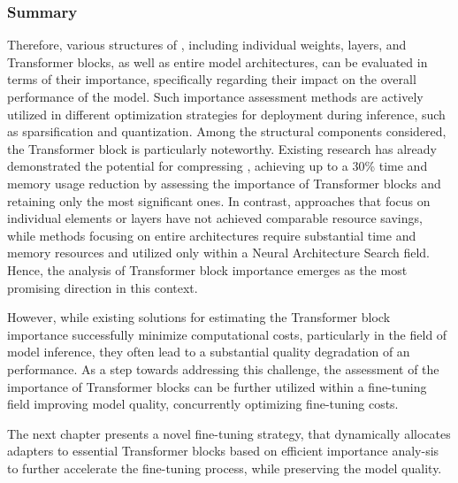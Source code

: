    \subsubsection{Summary}
        Therefore, various structures of \llms{}, including individual weights, layers, and Transformer blocks, as well as entire model architectures, can be evaluated in terms of their importance, specifically regarding their impact on the overall performance of the model. Such importance assessment methods are actively utilized in different optimization strategies for \llm{} deployment during inference, such as sparsification and quantization. Among the structural components considered, the Transformer block is particularly noteworthy. Existing research has already demonstrated the potential for compressing \llm{}, achieving up to a 30\% time and memory usage reduction by assessing the importance of Transformer blocks and retaining only the most significant ones. In contrast, approaches that focus on individual elements or layers have not achieved comparable resource savings, while methods focusing on entire architectures require substantial time and memory resources and utilized only within a Neural Architecture Search field. Hence, the analysis of Transformer block importance emerges as the most promising direction in this context. 

        However, while existing solutions for estimating the Transformer block importance successfully minimize computational costs, particularly  in the field of model inference, they often lead to a substantial quality degradation of an \llm{} performance. As a step towards addressing this challenge, the assessment of the importance of Transformer blocks can be further utilized within a fine-tuning field improving model quality, concurrently optimizing fine-tuning costs. 
        
        The next chapter presents a novel fine-tuning strategy, that dynamically allocates \lora{} adapters to essential Transformer blocks based on efficient importance analy-sis to further accelerate the fine-tuning process, while preserving the model quality.
